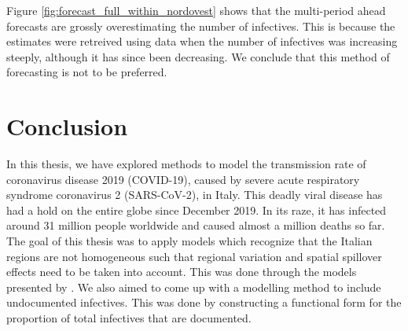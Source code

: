 \documentclass[12pt]{article}
\begin{document}
    Figure \ref{fig:forecast_full_within_nordovest} shows that the multi-period ahead forecasts are grossly overestimating the number of infectives. This is because the estimates were retreived using data when the number of infectives was increasing steeply, although it has since been decreasing. We conclude that this method of forecasting is not to be preferred.

	\section{Conclusion} \label{sec:conclusion}
	
	In this thesis, we have explored methods to model the transmission rate of coronavirus disease 2019 (COVID-19), caused by severe acute respiratory syndrome coronavirus 2 (SARS-CoV-2), in Italy. This deadly viral disease has had a hold on the entire globe since December 2019. In its raze, it has infected around 31 million people worldwide and caused almost a million deaths so far. The goal of this thesis was to apply models which recognize that the Italian regions are not homogeneous such that regional variation and spatial spillover effects need to be taken into account. This was done through the models presented by \textcite{adda2016economic}. We also aimed to come up with a modelling method to include undocumented infectives. This was done by constructing a functional form for the proportion of total infectives that are documented. 
	\\
	
\end{document}
